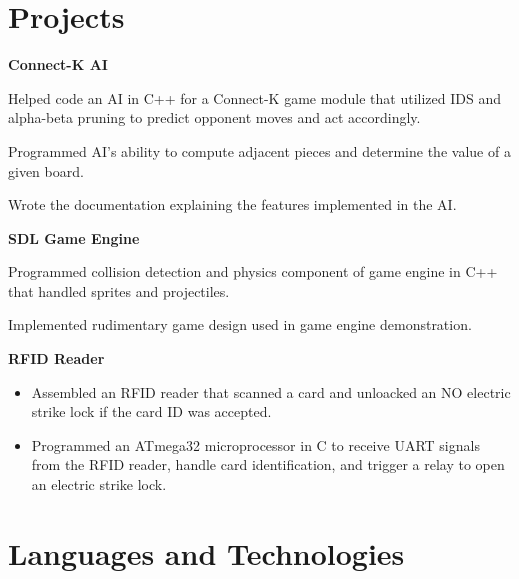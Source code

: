 \documentclass[10pt, letterpaper, sans]{moderncv} %
\begin{document}
\section{Projects}
\textbf{Connect-K AI}
\begin{itemize}
{
\item Helped code an AI in C++ for a Connect-K game module that utilized IDS and alpha-beta pruning to predict opponent moves and act accordingly.
\item Programmed AI's ability to compute adjacent pieces and determine the value of a given board.
\item Wrote the documentation explaining the features implemented in the AI.
}
\end{itemize}

\textbf{SDL Game Engine}
\begin{itemize}
{
\item Programmed collision detection and physics component of game engine in C++ that handled sprites and projectiles.
\item Implemented rudimentary game design used in game engine demonstration.
}
\end{itemize}

\textbf{RFID Reader}
\begin{itemize}
\item Assembled an RFID reader that scanned a card and unloacked an NO electric strike lock if the card ID was accepted.
\item Programmed an ATmega32 microprocessor in C to receive UART signals from the RFID reader, handle card identification, and trigger a relay to open an electric strike lock.
\end{itemize}


\section{Languages and Technologies}

\end{document}
